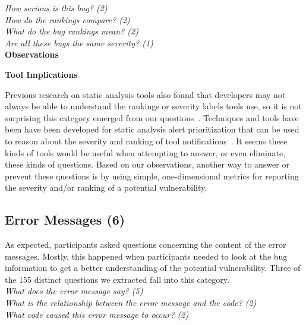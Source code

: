 \documentclass[conference]{IEEEtran}
\begin{document}
\noindent\emph{How serious is this bug? (2)} \\
\emph{How do the rankings compare? (2)} \\
\emph{What do the bug rankings mean? (2)} \\
\emph{Are all these bugs the same severity? (1)} \\

\noindent\textbf{Observations}


\noindent\textbf{Tool Implications}

Previous research on static analysis tools also found that developers may not always be able to understand the rankings or severity labels tools use, so it is not surprising this category emerged from our questions~\cite{johnson2013don}.
Techniques and tools have been have been developed for static analysis alert prioritization that can be used to reason about the severity and ranking of tool notifications~\cite{kim2007prioritizing, boogerd2006prioritizing, kremenek2004correlation}.
It seems these kinds of tools would be useful when attempting to answer, or even eliminate, these kinds of questions. 
Based on our observations, another way to answer or prevent these questions is by using simple, one-dimensional metrics for reporting the severity and/or ranking of a potential vulnerability.



\noindent\subsection{\textbf{Error Messages (6)}}\label{em}

As expected, participants asked questions concerning the content of the error messages. 
Mostly, this happened when participants needed to look at the bug information to get a better understanding of the potential vulnerability. 
Three of the 155 distinct questions we extracted fall into this category.
\\

\noindent\emph{What does the error message say? (5)} \\
\emph{What is the relationship between the error message and the code? (2)} \\
\emph{What code caused this error message to occur? (2)} \\
\end{document}
